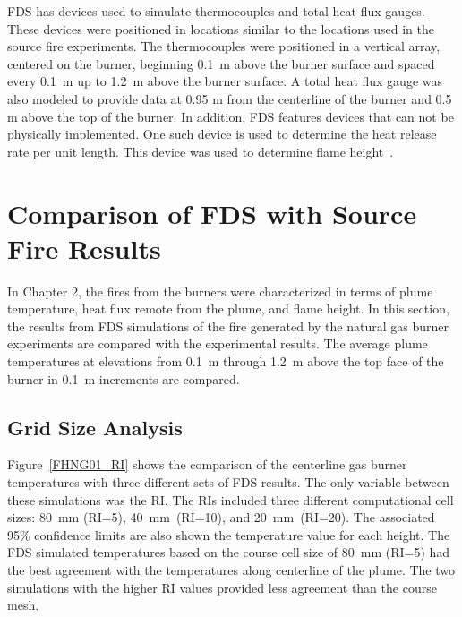 \documentclass[twoside]{uocthesis}
\begin{document}
{FDS has devices used to simulate thermocouples and total heat flux gauges.  These devices were positioned in locations similar to the locations used in the source fire experiments.  The thermocouples were positioned in a vertical array, centered on the burner, beginning 0.1~m above the burner surface and spaced every 0.1~m up to 1.2~m above the burner surface.  A total heat flux gauge was also modeled to provide data at 0.95 m from the centerline of the burner and 0.5 m above the top of the burner.  
In addition, FDS features devices that can not be physically implemented.  One such device is used to determine the heat release rate per unit length.  This device was used to determine flame height~\cite{McDermott:2011}. 

\section{Comparison of FDS with Source Fire Results}

In Chapter 2, the fires from the burners were characterized in terms of plume temperature, heat flux remote from the plume, and flame height.  In this section, the results from FDS simulations of the fire generated by the natural gas burner experiments are compared with the experimental results.  The average plume temperatures at elevations from 0.1~m through 1.2~m above the top face of the burner in 0.1~m increments are compared.   

\subsection{Grid Size Analysis}
Figure~\ref{FHNG01_RI} shows the comparison of the centerline gas burner temperatures with three different sets of FDS results.  The only variable between these simulations was the RI. The RIs included three different computational cell sizes: 80~mm (RI=5), 40~mm~(RI=10), and 20~mm~(RI=20).  The associated 95\% confidence limits are also shown the temperature value for each height.  The FDS simulated temperatures based on the course cell size of 80~mm (RI=5) had the best agreement with the temperatures along centerline of the plume.  The two simulations with the higher RI values provided less agreement than the course mesh.  

}
\end{document}
